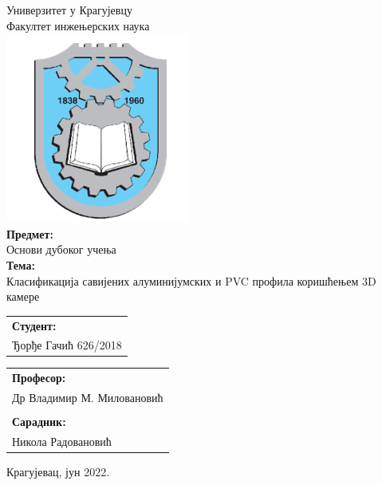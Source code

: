 \documentclass[12pt]{article}
\begin{document}
\thispagestyle{empty}
\begin{center}
\Large{
Универзитет у Крагујевцу
\vspace{0.3cm}\\
Факултет инжењерских наука
}
\vspace{0.7cm}\\
\includegraphics{images/fin_image}
\vspace{0.7cm}\\
\LARGE{
\textbf{Предмет:}
\vspace{0.1cm}\\
Основи дубоког учења
}
\vspace{1cm}\\
\LARGE{
\textbf{Тема:}
\vspace{0.1cm}\\
Класификација савијених алуминијумских и PVC профила коришћењем 3D камере
}
\vspace{2cm}
\end{center}

\begin{tabular}{l}
\textbf{Студент:}\\
Ђорђе Гачић 626/2018\\
\end{tabular}
\setlength{\tabcolsep}{12em}
\begin{tabular}{l}
\textbf{Професор:}\\
Др Владимир М. Миловановић\\
\vspace{0.02cm}\\
\textbf{Сарадник:}\\
Никола Радовановић\\
\end{tabular}
\begin{center}
\vspace{1cm}
\vspace{1cm}
Крагујевац, јун 2022.
\end{center}
\newpage
\end{document}
